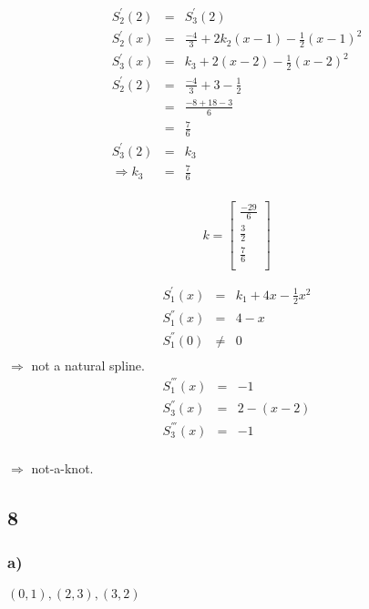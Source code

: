 \documentclass[12pt]{article}
\begin{document}
\begin{eqnarray*}
  S_2^{'}(2) & = & S_3^{'}(2)\\
  S_2^{'}(x) & = & \frac{-4}{3} + 2k_2(x-1) - \frac{1}{2}(x-1)^2\\
  S_3^{'}(x) & = & k_3 + 2(x-2) - \frac{1}{2}(x-2)^2\\
  S_2^{'}(2) & = & \frac{-4}{3} + 3 - \frac{1}{2}\\
  & = & \frac{-8 + 18 - 3}{6}\\
  & = & \frac{7}{6}\\
  S_3^{'}(2) & = & k_3\\
  \Rightarrow k_3 & = & \frac{7}{6}\\
\end{eqnarray*}

\begin{displaymath}
  k = \left[
    \begin{array}{lr}
      \frac{-29}{6}\\
      \frac{3}{2}\\
      \frac{7}{6}\\
    \end{array}
    \right]
\end{displaymath}

\begin{eqnarray*}
  S_1^{'}(x) & = & k_1 + 4x - \frac{1}{2}x^2\\
  S_1^{''}(x) & = & 4 - x\\
  S_1^{''}(0) & \neq & 0\\
\end{eqnarray*}
\(\Rightarrow\) not a natural spline.\\

\begin{eqnarray*}
  S_1^{'''}(x) & = & -1\\
  S_3^{''}(x) & = & 2 - (x-2)\\
  S_3^{'''}(x) & = & - 1\\
\end{eqnarray*}

\(\Rightarrow\) not-a-knot.\\
\subsection*{8}
\subsubsection*{a)}
\((0,1), (2,3), (3,2)\)\\
\end{document}
